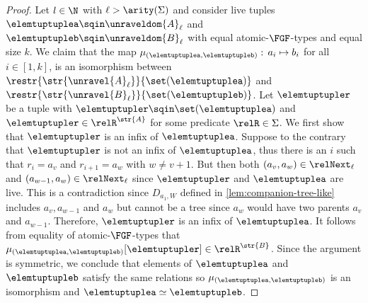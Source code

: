 \begin{proof}
Let $l \in \N$ with $\ell > \arity(\Sigma)$ and consider live tuples $\elemtuptuplea \sqin \unraveldom{A}_{\ell}$ and $\elemtuptupleb \sqin \unraveldom{B}_{\ell}$ with equal atomic-$\FGF$-types and equal size $k$.
We claim that the map $\mu_{(\elemtuptuplea, \elemtuptupleb)}:\, a_{i} \mapsto b_{i}$ for all $i \in [1, k]$, is an isomorphism between $\restr{\str{\unravel{A}_{\ell}}}{\set(\elemtuptuplea)}$ and $\restr{\str{\unravel{B}_{\ell}}}{\set(\elemtuptupleb)}$.
Let $\elemtuptupler$ be a tuple with $\elemtuptupler \sqin \set(\elemtuptuplea)$ and $\elemtuptupler \in \relR^{\str{A}}$ for some predicate $\relR \in \Sigma$.
We first show that $\elemtuptupler$ is an infix of $\elemtuptuplea$.
Suppose to the contrary that $\elemtuptupler$ is not an infix of $\elemtuptuplea$, thus there is an $i$ such that $r_{i} = a_{v}$ and $r_{i+1} = a_{w}$ with $w \ne v + 1$.
But then both $(a_{v}, a_{w}) \in \relNext_{\ell}$ and $(a_{w-1}, a_{w}) \in \relNext_{\ell}$ since $\elemtuptupler$ and $\elemtuptuplea$ are live.
This is a contradiction since $D_{a_{1}, W}$ defined in \cref{lem:companion-tree-like} includes $a_{v}, a_{w-1}$ and $a_{w}$ but cannot be a tree since $a_{w}$ would have two parents $a_{v}$ and $a_{w-1}$.
Therefore, $\elemtuptupler$ is an infix of $\elemtuptuplea$.
It follows from equality of atomic-$\FGF$-types that $\mu_{(\elemtuptuplea, \elemtuptupleb)}[\elemtuptupler] \in \relR^{\str{B}}$.
Since the argument is symmetric, we conclude that elements of $\elemtuptuplea$ and $\elemtuptupleb$ satisfy the same relations so $\mu_{(\elemtuptuplea, \elemtuptupleb)}$ is an isomorphism and $\elemtuptuplea \simeq \elemtuptupleb$.
\end{proof}
\fi
